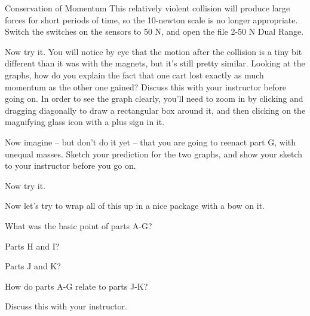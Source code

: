 \begin{lab}{Conservation of Momentum}
This relatively violent collision will produce large forces for short periods of time, so the 10-newton scale is no
longer appropriate. Switch the switches on the sensors to 50 N, and open the file 2-50 N Dual Range.

Now try it. You will notice by eye that the motion after the collision is a tiny bit different than it was with the magnets, but
 it's still pretty similar. Looking at the graphs, how do you explain the fact that one cart lost exactly as much momentum
 as the other one gained? Discuss this with your instructor before going on. In order to see the
graph clearly, you'll need to zoom in by clicking and dragging diagonally to draw a rectangular box around
it, and then clicking on the magnifying glass icon with a plus sign in it.

Now imagine -- but don't do it yet -- that you are going to reenact part G, with unequal masses. Sketch your prediction for the
 two graphs, and show your sketch to your instructor before you go on.

Now try it.

Now let's try to wrap all of this up in a nice package with a bow on it.

What was the basic point of parts A-G?

Parts H and I?

Parts J and K?

How do parts A-G relate to parts J-K?

Discuss this with your instructor.

\end{lab}

